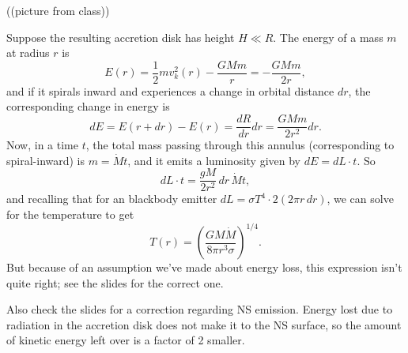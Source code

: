 \documentclass[../a122main.tex]{subfiles}
\begin{document}
((picture from class))

Suppose the resulting accretion disk has height $H \ll R$.
The energy of a mass $m$ at radius $r$ is
\[ E(r) = \frac{1}{2} m v_k^2(r) - \frac{GMm}{r} = -\frac{GMm}{2r}, \]
and if it spirals inward and experiences a change in orbital distance $dr$, the corresponding change in energy is
\[ dE = E (r + dr) - E(r) = \frac{dR}{dr} dr = \frac{GMm}{2r^2} dr. \]
Now, in a time $t$, the total mass passing through this annulus (corresponding to spiral-inward) is $m = \dot M t$, and it emits a luminosity given by $dE = dL \cdot t$.
So
\[ dL \cdot t = \frac{gM}{2r^2} \, dr \, \dot M t, \]
and recalling that for an blackbody emitter $dL = \sigma T^{4} \cdot 2(2\pi r \, dr)$, we can solve for the temperature to get
\[ T(r) = \left( \frac{GM \dot M}{8\pi r^3 \sigma} \right)^{1 / 4}. \]
But because of an assumption we've made about energy loss, this expression isn't quite right; see the slides for the correct one.

Also check the slides for a correction regarding NS emission.
Energy lost due to radiation in the accretion disk does not make it to the NS surface, so the amount of kinetic energy left over is a factor of 2 smaller.





    
\end{document}
